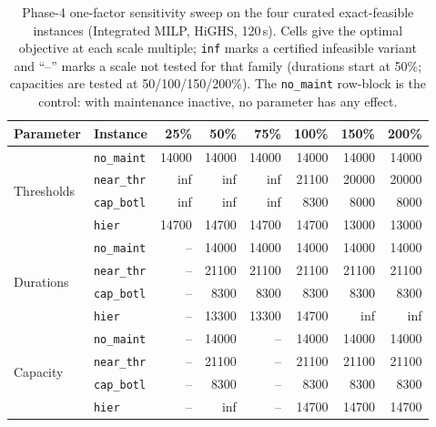 \begin{table}[t]
\centering\small\setlength{\tabcolsep}{4pt}
\caption{Phase-4 one-factor sensitivity sweep on the four curated
  exact-feasible instances (Integrated MILP, HiGHS, 120\,s).  Cells give the
  optimal objective at each scale multiple; \texttt{inf} marks a certified
  infeasible variant and ``--'' marks a scale not tested for that family
  (durations start at 50\%; capacities are tested at 50/100/150/200\%).  The
  \texttt{no\_maint} row-block is the control: with maintenance inactive, no
  parameter has any effect.}
\label{tab:sensitivity}
\begin{tabular}{@{}llrrrrrr@{}}
\toprule
Parameter & Instance & 25\% & 50\% & 75\% & 100\% & 150\% & 200\% \\
\midrule
\multirow{4}{*}{Thresholds}
 & \texttt{no\_maint} & 14000 & 14000 & 14000 & 14000 & 14000 & 14000 \\
 & \texttt{near\_thr} & inf   & inf   & inf   & 21100 & 20000 & 20000 \\
 & \texttt{cap\_botl} & inf   & inf   & inf   & 8300  & 8000  & 8000  \\
 & \texttt{hier}      & 14700 & 14700 & 14700 & 14700 & 13000 & 13000 \\
\midrule
\multirow{4}{*}{Durations}
 & \texttt{no\_maint} & --    & 14000 & 14000 & 14000 & 14000 & 14000 \\
 & \texttt{near\_thr} & --    & 21100 & 21100 & 21100 & 21100 & 21100 \\
 & \texttt{cap\_botl} & --    & 8300  & 8300  & 8300  & 8300  & 8300  \\
 & \texttt{hier}      & --    & 13300 & 13300 & 14700 & inf   & inf   \\
\midrule
\multirow{4}{*}{Capacity}
 & \texttt{no\_maint} & --    & 14000 & --    & 14000 & 14000 & 14000 \\
 & \texttt{near\_thr} & --    & 21100 & --    & 21100 & 21100 & 21100 \\
 & \texttt{cap\_botl} & --    & 8300  & --    & 8300  & 8300  & 8300  \\
 & \texttt{hier}      & --    & inf   & --    & 14700 & 14700 & 14700 \\
\bottomrule
\end{tabular}
\end{table}

